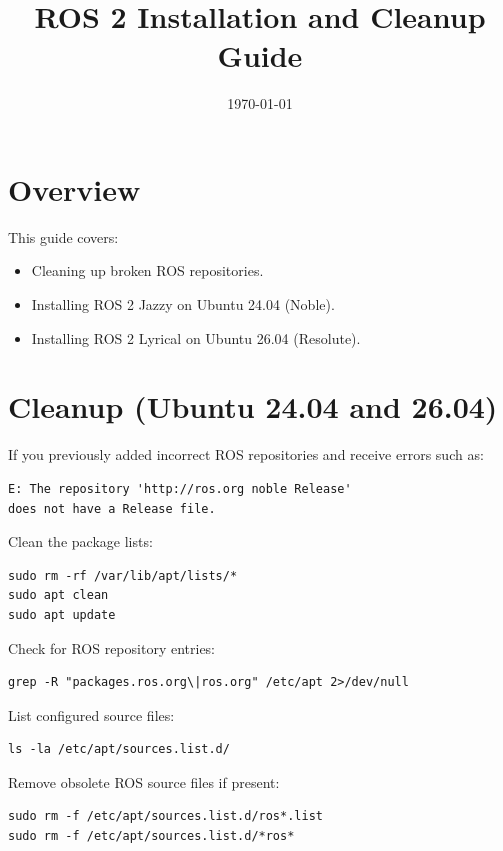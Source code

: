 \documentclass[11pt]{article}
\title{ROS 2 Installation and Cleanup Guide}
\author{}
\date{\today}
\begin{document}
\maketitle

\section{Overview}

This guide covers:
\begin{itemize}
\item Cleaning up broken ROS repositories.
\item Installing ROS 2 Jazzy on Ubuntu 24.04 (Noble).
\item Installing ROS 2 Lyrical on Ubuntu 26.04 (Resolute).
\end{itemize}

\section{Cleanup (Ubuntu 24.04 and 26.04)}

If you previously added incorrect ROS repositories and receive errors such as:

\begin{verbatim}
E: The repository 'http://ros.org noble Release'
does not have a Release file.
\end{verbatim}

Clean the package lists:

\begin{verbatim}
sudo rm -rf /var/lib/apt/lists/*
sudo apt clean
sudo apt update
\end{verbatim}

Check for ROS repository entries:

\begin{verbatim}
grep -R "packages.ros.org\|ros.org" /etc/apt 2>/dev/null
\end{verbatim}

List configured source files:

\begin{verbatim}
ls -la /etc/apt/sources.list.d/
\end{verbatim}

Remove obsolete ROS source files if present:

\begin{verbatim}
sudo rm -f /etc/apt/sources.list.d/ros*.list
sudo rm -f /etc/apt/sources.list.d/*ros*
\end{verbatim}
\end{document}
